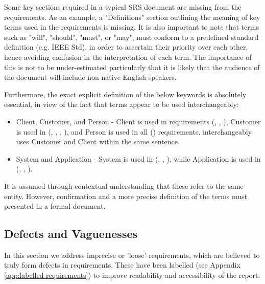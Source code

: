 Some key sections required in a typical SRS document are missing from the requirements.  As an example, a "Definitions" section outlining the meaning of key terms used in the requirements is missing.  It is also important to note that terms such as "will", "should", "must", or "may", must conform to a predefined standard definition (e.g. IEEE Std), in order to ascertain their priority over each other, hence avoiding confusion in the interpretation of each term. The importance of this is not to be under-estimated particularly that it is likely that the audience of the document will include non-native English speakers.
\par
Furthermore, the exact explicit definition of the below keywords is absolutely essential, in view of the fact that terms appear to be used interchangeably:
\begin{itemize}
    \item Client, Customer, and Person - Client is used in requirements (\ROne, \RTwo, \RFive), Customer is used in (\RTwo, \RThree, \RFour, \RFive), and Person is used in all (\REight) requirements. \RFive \space interchangeably uses Customer and Client within the same sentence. 
    \item System and Application - System is used in (\RTwo, \RSix, \RSeven), while Application is used in (\ROne, \RFour, \RFive). 
\end{itemize}
It is assumed through contextual understanding that these refer to the same entity.  However, confirmation and a more precise definition of the terms must presented in a formal document.
\par


\subsection{Defects and Vaguenesses}
\label{sec:defects-and-vaguenesses}
In this section we address imprecise or 'loose' requirements, which are believed to truly form defects in requirements.
These have been labelled (see Appendix \ref{app:labelled-requirements}) to improve readability and accessibility of the report.

